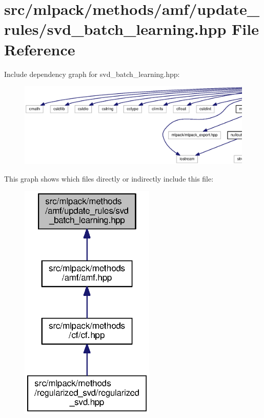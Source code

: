 \section{src/mlpack/methods/amf/update\+\_\+rules/svd\+\_\+batch\+\_\+learning.hpp File Reference}
\label{svd__batch__learning_8hpp}
Include dependency graph for svd\+\_\+batch\+\_\+learning.\+hpp\+:
\nopagebreak
\begin{figure}[H]
\begin{center}
\leavevmode
\includegraphics[width=350pt]{svd__batch__learning_8hpp__incl}
\end{center}
\end{figure}
This graph shows which files directly or indirectly include this file\+:
\nopagebreak
\begin{figure}[H]
\begin{center}
\leavevmode
\includegraphics[width=182pt]{svd__batch__learning_8hpp__dep__incl}
\end{center}
\end{figure}
